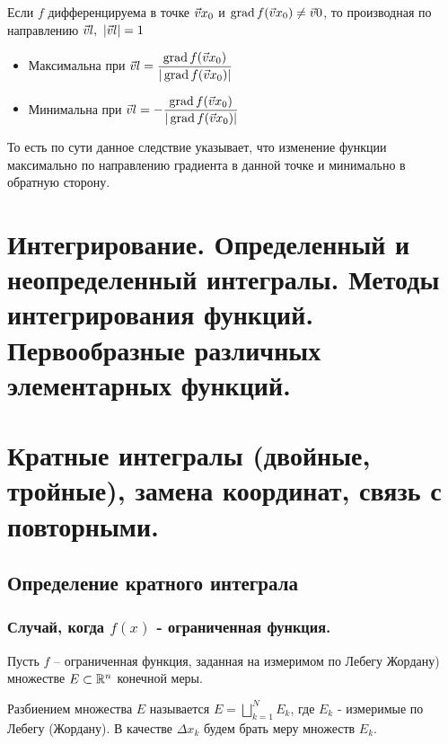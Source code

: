 \begin{multicols}{2}
    \cons 
	Если $f$ дифференцируема в точке $\vec{v}{x}_0$ и $\operatorname{grad} f(\vec{v}{x}_0) \neq \vec{v}{0}$, то производная по направлению $\vec{v}{l},\ |\vec{v}{l}| = 1$
	\begin{itemize}
		\item Максимальна при $\vec{v}{l} = \dfrac{\operatorname{grad} f(\vec{v}{x}_0)}{|\operatorname{grad} f(\vec{v}{x}_0)|}$
		
		\item Минимальна при $\vec{v}{l} = -\dfrac{\operatorname{grad} f(\vec{v}{x}_0)}{|\operatorname{grad} f(\vec{v}{x}_0)|}$
	\end{itemize}

\begin{note}{}{}
	То есть по сути данное следствие указывает, что изменение функции максимально по направлению градиента в данной точке и минимально в обратную сторону.
\end{note}
    \section{Интегрирование. Определенный и неопределенный интегралы. Методы интегрирования
    функций. Первообразные различных элементарных функций.}

    \section{Кратные интегралы (двойные, тройные), замена координат, связь с повторными.}
    \subsection*{Определение кратного интеграла}
\subsubsection*{Случай, когда $f(x)$ - ограниченная функция.}
\begin{definition}{}{}
Пусть $f$ -- ограниченная функция, заданная на измеримом по Лебегу Жордану) множестве $E \subset \mathbb{R}^n$ конечной меры. 

$\textbf{Разбиением}$ множества $E$ называется $E=\bigsqcup\limits_{k=1}^N E_k$, где $E_k$ - измеримые по Лебегу (Жордану). \newline В качестве $\Delta x_k$ будем брать меру множеств $E_k$. 


\end{definition}
\end{multicols}
